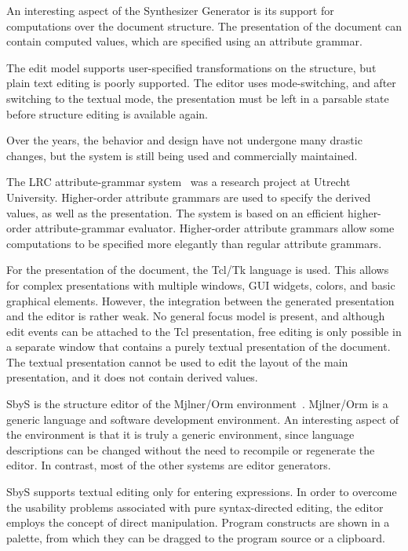 \documentclass{speauth}
\begin{document}

An interesting aspect of the Synthesizer Generator is its support for computations over the document structure. The presentation of the document can contain computed values, which are specified using an attribute grammar. 

The edit model supports user-specified transformations on the structure, but plain text editing is poorly supported. The editor uses mode-switching, and after switching to the textual mode, the presentation must be left in a parsable state before structure editing is available again.

Over the years, the behavior and design have not undergone many drastic changes, but the system is still being used and commercially maintained.


The LRC attribute-grammar system~\cite{saraiva00lrc} was a research project at Utrecht University. Higher-order attribute grammars are used to specify the derived values, as well as the presentation. The system is based on an efficient higher-order attribute-grammar evaluator. Higher-order attribute grammars allow some computations to be specified more elegantly than regular attribute grammars.

For the presentation of the document, the Tcl/Tk language is used. This allows for complex presentations with multiple windows, GUI widgets, colors, and basic graphical elements. However, the integration between the generated presentation and the editor is rather weak. No general focus model is present, and although edit events can be attached to the Tcl presentation, free editing is only possible in a separate window that contains a purely textual presentation of the document. The textual presentation cannot be used to edit the layout of the main presentation, and it does not contain derived values. 


SbyS is the structure editor of the Mj\slasho lner/Orm environment~\cite{magnusson90orm}. Mj\slasho lner/Orm is a generic language and software development environment. An interesting aspect of the environment is that it is truly a generic environment, since language descriptions can be changed without the need to recompile or regenerate the editor. In contrast, most of the other systems are editor generators.

SbyS supports textual editing only for entering expressions. In order to overcome the usability problems associated with pure syntax-directed editing, the editor employs the concept of direct manipulation. Program constructs are shown in a palette, from which they can be dragged to the program source or a clipboard.
\end{document}
